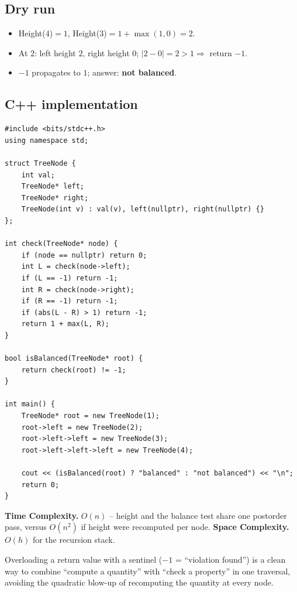 \subsection*{Dry run}


\begin{itemize}
  \item Height($4$)$=1$, Height($3$)$=1+\max(1,0)=2$.
  \item At $2$: left height $2$, right height $0$; $|2-0|=2>1
        \Rightarrow$ return $-1$.
  \item $-1$ propagates to $1$; answer: \textbf{not balanced}.
\end{itemize}

\subsection*{C++ implementation}

\begin{lstlisting}
#include <bits/stdc++.h>
using namespace std;

struct TreeNode {
    int val;
    TreeNode* left;
    TreeNode* right;
    TreeNode(int v) : val(v), left(nullptr), right(nullptr) {}
};

int check(TreeNode* node) {
    if (node == nullptr) return 0;
    int L = check(node->left);
    if (L == -1) return -1;
    int R = check(node->right);
    if (R == -1) return -1;
    if (abs(L - R) > 1) return -1;
    return 1 + max(L, R);
}

bool isBalanced(TreeNode* root) {
    return check(root) != -1;
}

int main() {
    TreeNode* root = new TreeNode(1);
    root->left = new TreeNode(2);
    root->left->left = new TreeNode(3);
    root->left->left->left = new TreeNode(4);

    cout << (isBalanced(root) ? "balanced" : "not balanced") << "\n";
    return 0;
}
\end{lstlisting}

\begin{complexitybox}
\textbf{Time Complexity.} $O(n)$ -- height and the balance test share one
postorder pass, versus $O(n^2)$ if height were recomputed per node.
\textbf{Space Complexity.} $O(h)$ for the recursion stack.
\end{complexitybox}

\begin{takeawaybox}
Overloading a return value with a sentinel ($-1$ = ``violation found'') is
a clean way to combine ``compute a quantity'' with ``check a property''
in one traversal, avoiding the quadratic blow-up of recomputing the
quantity at every node.
\end{takeawaybox}
